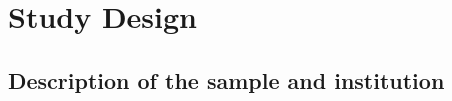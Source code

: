 \documentclass[12pt]{article}
\begin{document}




\section{Study Design} \label{studydesign}

\subsection{Description of the sample and institution}
\end{document}
